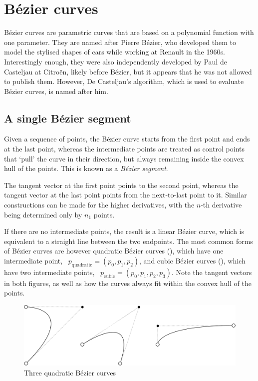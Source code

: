 \section{B\'ezier curves}

B\'ezier curves are parametric curves that are based on a polynomial function with one parameter.
They are named after Pierre B\'ezier, who developed them to model the stylised shapes of cars while working at Renault in the 1960s.
Interestingly enough, they were also independently developed by Paul de Casteljau at Citro\"en, likely before B\'ezier, but it appears that he was not allowed to publish them.
However, De Casteljau's algorithm, which is used to evaluate B\'ezier curves, is named after him.

\subsection{A single B\'ezier segment}

Given a sequence of points, the B\'ezier curve starts from the first point and ends at the last point, whereas the intermediate points are treated as control points that `pull' the curve in their direction, but always remaining inside the convex hull of the points.
This is known as a \emph{B\'ezier segment}.

The tangent vector at the first point points to the second point, whereas the tangent vector at the last point points from the next-to-last point to it.
Similar constructions can be made for the higher derivatives, with the \(n\)-th derivative being determined only by \(n_1\) points.

If there are no intermediate points, the result is a linear B\'ezier curve, which is equivalent to a straight line between the two endpoints.
The most common forms of B\'ezier curves are however quadratic B\'ezier curves (), which have one intermediate point, \eg\ \(p_{\mathrm{quadratic}} = (p_0, p_1, p_2)\), and cubic B\'ezier curves (), which have two intermediate points, \eg\ \(p_{\mathrm{cubic}} = (p_0, p_1, p_2, p_3)\).
Note the tangent vectors in both figures, as well as how the curves always fit within the convex hull of the points.

\begin{figure}
\centering
\includegraphics[width=\linewidth]{figs/quadratic}
\caption{Three quadratic B\'ezier curves}%
\label{fig:quadratic}
\end{figure}

